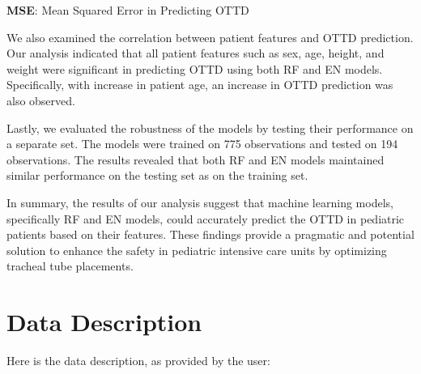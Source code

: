 \documentclass[11pt]{article}
\begin{document}
\begin{table}[h]
\caption{Performance of Random Forest (RF) and Elastic Net (EN) models}
\label{table:performance_en_rf}
\begin{threeparttable}
\renewcommand{\TPTminimum}{\linewidth}
\begin{tablenotes}
\footnotesize
\item \textbf{MSE}: Mean Squared Error in Predicting OTTD
\end{tablenotes}
\end{threeparttable}
\end{table}


We also examined the correlation between patient features and OTTD prediction. Our analysis indicated that all patient features such as sex, age, height, and weight were significant in predicting OTTD using both RF and EN models. Specifically, with increase in patient age, an increase in OTTD prediction was also observed.

Lastly, we evaluated the robustness of the models by testing their performance on a separate set. The models were trained on 775 observations and tested on 194 observations. The results revealed that both RF and EN models maintained similar performance on the testing set as on the training set.

In summary, the results of our analysis suggest that machine learning models, specifically RF and EN models, could accurately predict the OTTD in pediatric patients based on their features. These findings provide a pragmatic and potential solution to enhance the safety in pediatric intensive care units by optimizing tracheal tube placements.


\clearpage
\appendix

\section{Data Description} \label{sec:data_description} Here is the data description, as provided by the user:
\end{document}
